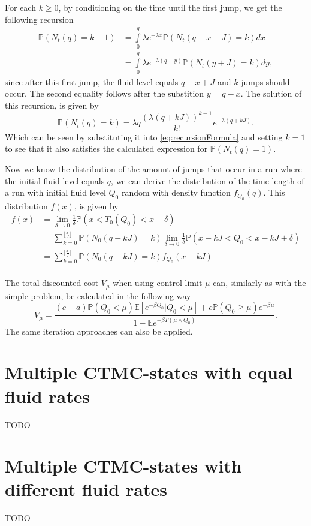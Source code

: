 For each $k\geq0$, by conditioning on the time until the first jump, we get the following recursion
\begin{equation}\label{eq:recursionFormula}
\begin{split}
\mathbb{P}(N_t(q)=k+1)&=\int\limits_0^{q}\lambda e^{-\lambda x}\mathbb{P}(N_t(q-x+J)=k)dx\\
&=\int\limits_0^{q}\lambda e^{-\lambda (q-y)}\mathbb{P}(N_t(y+J)=k)dy,
\end{split}
\end{equation}
since after this first jump, the fluid level equals $q-x+J$ and $k$ jumps should occur. The second equality follows after the substition $y=q-x$.
The solution of this recursion, is given by
$$
\mathbb{P}(N_t(q)=k)=\lambda q\frac{(\lambda (q+kJ))^{k-1}}{k!}e^{-\lambda(q+kJ)}.
$$
Which can be seen by substituting it into \eqref{eq:recursionFormula} and setting $k=1$ to see that it also satisfies the calculated expression for $\mathbb{P}(N_t(q)=1)$.

Now we know the distribution of the amount of jumps that occur in a run where the initial fluid level equals $q$, we can derive the distribution of the time length of a run with initial fluid level $Q_0$ random with density function $f_{Q_0}(q)$.
This distribution $f(x)$, is given by
\begin{equation}
\begin{split}
f(x)&=\lim\limits_{\delta\rightarrow 0}\frac{1}{\delta}\mathbb{P}(x<T_0(Q_0)<x+\delta)\\
&=\sum\limits_{k=0}^{\lfloor\frac{x}{J}\rfloor}\mathbb{P}(N_0(q-kJ)=k)\lim\limits_{\delta\rightarrow 0}\frac{1}{\delta}\mathbb{P}(x-kJ<Q_0<x-kJ+\delta)\\
&=\sum\limits_{k=0}^{\lfloor\frac{x}{J}\rfloor}\mathbb{P}(N_0(q-kJ)=k)f_{Q_0}(x-kJ)\\
\end{split}
\end{equation}

The total discounted cost $V_\mu$ when using control limit $\mu$ can, similarly as with the simple problem, be calculated in the following way
\begin{equation}
V_\mu=\frac{(c+a)\mathbb{P}(Q_0<\mu)\mathbb{E}[e^{-\beta Q_0}|Q_0<\mu]+c\mathbb{P}(Q_0\geq \mu)e^{-\beta\mu}}{1-\mathbb{E}e^{-\beta T(\mu\wedge Q_0)}}.
\end{equation}
The same iteration approaches can also be applied.

\section{Multiple CTMC-states with equal fluid rates}
TODO
\section{Multiple CTMC-states with different fluid rates}
TODO
